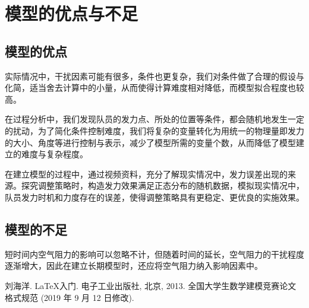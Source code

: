 \documentclass[withoutpreface,bwprint]{cumcmthesis} %
\begin{document}
\section{模型的优点与不足}
\subsection{模型的优点}
实际情况中，干扰因素可能有很多，条件也更复杂，我们对条件做了合理的假设与化简，适当舍去计算中的小量，从而使得计算难度相对降低，而模型拟合程度也较高。

在过程分析中，我们发现队员的发力点、所处的位置等条件，都会随机地发生一定的扰动，为了简化条件控制难度，我们将复杂的变量转化为用统一的物理量即发力的大小、角度等进行控制与表示，减少了模型所需的变量个数，从而降低了模型建立的难度与复杂程度。

在建立模型的过程中，通过视频资料，充分了解现实情况中，发力误差出现的来源。探究调整策略时，构造发力效果满足正态分布的随机数据，模拟现实情况中，队员发力时机和力度存在的误差，使得调整策略具有更稳定、更优良的实施效果。
\subsection{模型的不足}
短时间内空气阻力的影响可以忽略不计，但随着时间的延长，空气阻力的干扰程度逐渐增大，因此在建立长期模型时，还应将空气阻力纳入影响因素中。
\newpage

\begin{thebibliography}{9}%
    刘海洋.
    \newblock \LaTeX {}入门\allowbreak[J].
    \newblock 电子工业出版社, 北京, 2013.
    全国大学生数学建模竞赛论文格式规范 (2019 年 9 月 12 日修改).
\end{thebibliography}
\end{document}
